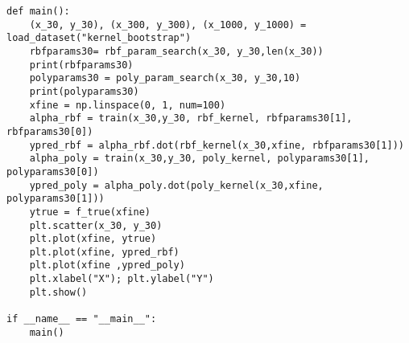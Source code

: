 \documentclass{article}
\begin{document}
\begin{aprob}
\begin{enumerate}
\begin{lstlisting}
def main():
    (x_30, y_30), (x_300, y_300), (x_1000, y_1000) = load_dataset("kernel_bootstrap")
    rbfparams30= rbf_param_search(x_30, y_30,len(x_30))
    print(rbfparams30)
    polyparams30 = poly_param_search(x_30, y_30,10)
    print(polyparams30)
    xfine = np.linspace(0, 1, num=100)
    alpha_rbf = train(x_30,y_30, rbf_kernel, rbfparams30[1], rbfparams30[0])
    ypred_rbf = alpha_rbf.dot(rbf_kernel(x_30,xfine, rbfparams30[1]))
    alpha_poly = train(x_30,y_30, poly_kernel, polyparams30[1], polyparams30[0])
    ypred_poly = alpha_poly.dot(poly_kernel(x_30,xfine, polyparams30[1]))
    ytrue = f_true(xfine)
    plt.scatter(x_30, y_30)
    plt.plot(xfine, ytrue)
    plt.plot(xfine, ypred_rbf)
    plt.plot(xfine ,ypred_poly)
    plt.xlabel("X"); plt.ylabel("Y")
    plt.show()

if __name__ == "__main__":
    main()
    
        \end{lstlisting}

        
    \end{enumerate}

\end{aprob}

\iffalse
\end{document}
